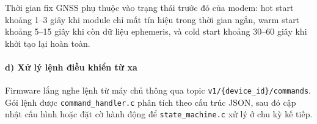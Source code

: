 \documentclass[a4paper]{extarticle}
\begin{document}
Thời gian fix GNSS phụ thuộc vào trạng thái trước đó của modem: hot
start khoảng 1--3 giây khi module chỉ mất tín hiệu trong thời gian ngắn,
warm start khoảng 5--15 giây khi còn dữ liệu ephemeris, và cold start
khoảng 30--60 giây khi khởi tạo lại hoàn toàn.

\paragraph{d) Xử lý lệnh điều khiển từ
xa}\label{d-xux1eed-luxfd-lux1ec7nh-ux111iux1ec1u-khiux1ec3n-tux1eeb-xa}

Firmware lắng nghe lệnh từ máy chủ thông qua topic
\texttt{v1/\{device\_id\}/commands}. Gói lệnh được
\texttt{command\_handler.c} phân tích theo cấu trúc JSON, sau đó cập
nhật cấu hình hoặc đặt cờ hành động để \texttt{state\_machine.c} xử lý ở
chu kỳ kế tiếp.
\end{document}
